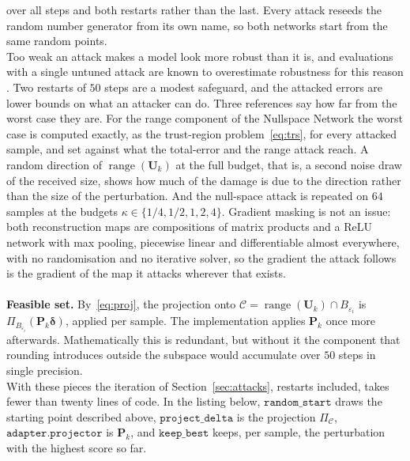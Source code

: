 \documentclass{article}
\numberwithin{equation}{section}
\begin{document}
over all steps and both restarts rather than the last. Every attack reseeds the random number generator
from its own name, so both networks start from the same random points.\\
Too weak an attack makes a model look more robust than it is, and evaluations with a single
untuned attack are known to overestimate robustness for this reason \parencite{croce2020reliable}.
Two restarts of $50$ steps are a modest safeguard, and the attacked errors are lower bounds on what an
attacker can do. Three references say how far from the worst case they are. For the range component of
the Nullspace Network the worst case is computed exactly, as the trust-region problem~\eqref{eq:trs}, for
every attacked sample, and set against what the total-error and the range
attack reach. A random direction of $\operatorname{range}(\mathbf{U}_k)$ at the full budget, that is, a
second noise draw of the received size, shows how much of the damage is due to the direction rather than
the size of the perturbation. And the null-space attack is repeated on $64$ samples at the budgets
$\kappa\in\{1/4,1/2,1,2,4\}$. Gradient masking \parencite{athalye2018obfuscated} is not an issue: both
reconstruction maps are compositions of matrix products and a ReLU network with max pooling, piecewise
linear and differentiable almost everywhere, with no randomisation and no iterative solver, so the
gradient the attack follows is the gradient of the map it attacks wherever that exists.\\\\
\textbf{Feasible set.} By~\eqref{eq:proj}, the projection onto
$\mathcal{C}=\operatorname{range}(\mathbf{U}_k)\cap B_{\varepsilon_i}$ is
$\Pi_{B_{\varepsilon_i}}(\mathbf{P}_k\boldsymbol{\delta})$, applied per sample. The implementation applies
$\mathbf{P}_k$ once more afterwards. Mathematically this is redundant, but without it the component that
rounding introduces outside the subspace would accumulate over $50$ steps in single precision.\\
With these pieces the iteration of Section~\ref{sec:attacks}, restarts included, takes fewer than twenty
lines of code. In the listing below, $\texttt{random\_start}$ draws the starting point described above,
$\texttt{project\_delta}$ is the projection $\Pi_{\mathcal{C}}$, $\texttt{adapter.projector}$ is
$\mathbf{P}_k$, and $\texttt{keep\_best}$ keeps, per sample, the perturbation with the highest score so far.
\end{document}
